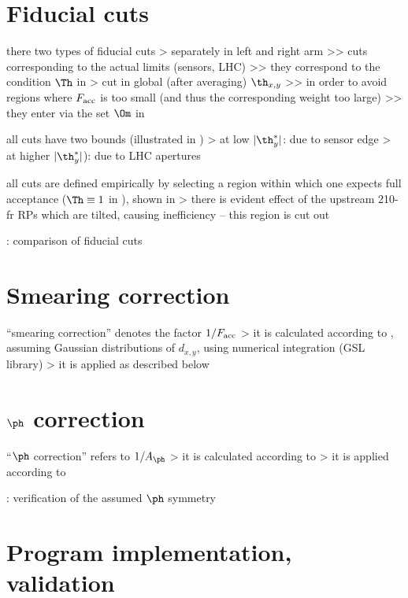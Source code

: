 \section{Fiducial cuts}

\> there two types of fiducial cuts
\>> separately in left and right arm
\>>> cuts corresponding to the actual limits (sensors, LHC)
\>>> they correspond to the condition $\Th$ in 
\>> cut in global (after averaging) $\th_{x, y}$
\>>> in order to avoid regions where $F_{\rm acc}$ is too small (and thus the corresponding weight too large)
\>>> they enter via the set $\Om$ in 

\> all cuts have two bounds (illustrated in )
\>> at low $|\th_y^*|$: due to sensor edge
\>> at higher $|\th_y^*|$): due to LHC apertures

\> all cuts are defined empirically by selecting a region within which one expects full acceptance ($\Th \equiv 1$ in ), shown in 
\>> there is evident effect of the upstream 210-fr RPs which are tilted, causing inefficiency -- this region is cut out

\> : comparison of fiducial cuts


\section{Smearing correction}

\> ``smearing correction'' denotes the factor $1/F_{\rm acc}$
\>> it is calculated according to , assuming Gaussian distributions of $d_{x,y}$, using numerical integration (GSL library)
\>> it is applied as described below 


\section{$\ph$ correction}

\> ``$\ph$ correction'' refers to $1 / A_{\ph}$
\>> it is calculated according to 
\>> it is applied according to 


\>  : verification of the assumed $\ph$ symmetry


\section{Program implementation, validation}

